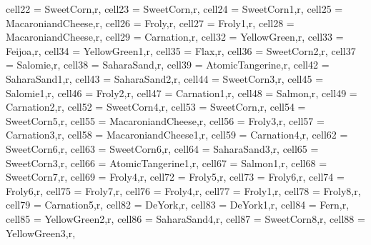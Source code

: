 \begin{table}[H]
	\centering
	\begin{adjustbox}{width=\textwidth}
		\begin{tblr}{
				cell{2}{2} = {SweetCorn,r},
				cell{2}{3} = {SweetCorn,r},
				cell{2}{4} = {SweetCorn1,r},
				cell{2}{5} = {MacaroniandCheese,r},
				cell{2}{6} = {Froly,r},
				cell{2}{7} = {Froly1,r},
				cell{2}{8} = {MacaroniandCheese,r},
				cell{2}{9} = {Carnation,r},
				cell{3}{2} = {YellowGreen,r},
				cell{3}{3} = {Feijoa,r},
				cell{3}{4} = {YellowGreen1,r},
				cell{3}{5} = {Flax,r},
				cell{3}{6} = {SweetCorn2,r},
				cell{3}{7} = {Salomie,r},
				cell{3}{8} = {SaharaSand,r},
				cell{3}{9} = {AtomicTangerine,r},
				cell{4}{2} = {SaharaSand1,r},
				cell{4}{3} = {SaharaSand2,r},
				cell{4}{4} = {SweetCorn3,r},
				cell{4}{5} = {Salomie1,r},
				cell{4}{6} = {Froly2,r},
				cell{4}{7} = {Carnation1,r},
				cell{4}{8} = {Salmon,r},
				cell{4}{9} = {Carnation2,r},
				cell{5}{2} = {SweetCorn4,r},
				cell{5}{3} = {SweetCorn,r},
				cell{5}{4} = {SweetCorn5,r},
				cell{5}{5} = {MacaroniandCheese,r},
				cell{5}{6} = {Froly3,r},
				cell{5}{7} = {Carnation3,r},
				cell{5}{8} = {MacaroniandCheese1,r},
				cell{5}{9} = {Carnation4,r},
				cell{6}{2} = {SweetCorn6,r},
				cell{6}{3} = {SweetCorn6,r},
				cell{6}{4} = {SaharaSand3,r},
				cell{6}{5} = {SweetCorn3,r},
				cell{6}{6} = {AtomicTangerine1,r},
				cell{6}{7} = {Salmon1,r},
				cell{6}{8} = {SweetCorn7,r},
				cell{6}{9} = {Froly4,r},
				cell{7}{2} = {Froly5,r},
				cell{7}{3} = {Froly6,r},
				cell{7}{4} = {Froly6,r},
				cell{7}{5} = {Froly7,r},
				cell{7}{6} = {Froly4,r},
				cell{7}{7} = {Froly1,r},
				cell{7}{8} = {Froly8,r},
				cell{7}{9} = {Carnation5,r},
				cell{8}{2} = {DeYork,r},
				cell{8}{3} = {DeYork1,r},
				cell{8}{4} = {Fern,r},
				cell{8}{5} = {YellowGreen2,r},
				cell{8}{6} = {SaharaSand4,r},
				cell{8}{7} = {SweetCorn8,r},
				cell{8}{8} = {YellowGreen3,r},
}
\end{tblr}
\end{adjustbox}
\end{table}
